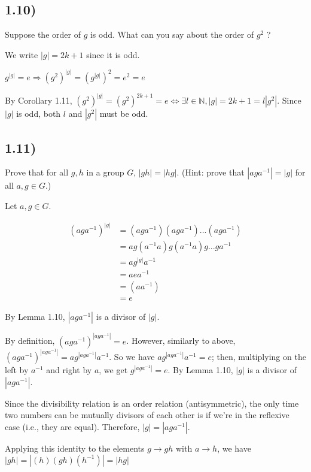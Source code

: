 \subsection*{1.10)}

Suppose the order of $g$ is odd. What can you say about the order of $g^2$ ?

We write $|g| = 2k + 1$ since it is odd.

$g^{|g|} = e \Rightarrow (g^2)^{|g|} = (g^{|g|})^2 = e^2 = e$

By Corollary 1.11, $(g^2)^{|g|} = (g^2)^{2k + 1} = e \Leftrightarrow \exists l \in \mathbb{N}, |g| = 2k + 1 = l|g^2|$. Since $|g|$ is odd, both $l$ and $|g^2|$ must be odd.



\subsection*{1.11)}

Prove that for all $g, h$ in a group $G$, $|gh| = |hg|$. (Hint: prove that $|aga^{-1}| = |g|$ for all $a, g \in G$.)

Let $a, g \in G$.

$$
\begin{array}{ll}
(aga^{-1})^{|g|} &= (aga^{-1})(aga^{-1})...(aga^{-1}) \\
                 &= ag(a^{-1}a)g(a^{-1}a)g...ga^{-1} \\
                 &= ag^{|g|}a^{-1} \\
                 &= aea^{-1} \\
                 &= (aa^{-1}) \\
                 &= e
\end{array}
$$

By Lemma 1.10, $|aga^{-1}|$ is a divisor of $|g|$.

By definition, $(aga^{-1})^{|aga^{-1}|} = e$. However, similarly to above, $(aga^{-1})^{|aga^{-1}|} = ag^{|aga^{-1}|}a^{-1}$. So we have $ag^{|aga^{-1}|}a^{-1} = e$; then, multiplying on the left by $a^{-1}$ and right by $a$, we get $g^{|aga^{-1}|} = e$. By Lemma 1.10, $|g|$ is a divisor of $|aga^{-1}|$.

Since the divisibility relation is an order relation (antisymmetric), the only time two numbers can be mutually divisors of each other is if we're in the reflexive case (i.e., they are equal). Therefore, $|g| = |aga^{-1}|$.

Applying this identity to the elements $g \to gh$ with $a \to h$, we have $|gh| = |(h)(gh)(h^{-1})| = |hg|$



